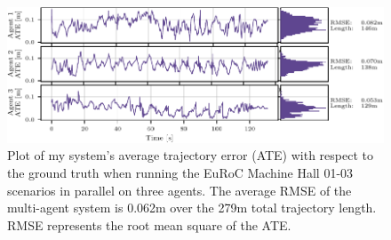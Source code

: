 \begin{figure}[h]
    \centering
    \includegraphics[width=\linewidth]{figures/apr11_tum_room_trajectory_a_line_plot.pdf}

    \caption{Plot of my system's average trajectory error (ATE) with respect to the ground truth when running the EuRoC Machine Hall 01-03 scenarios in parallel on three agents. The average RMSE of the multi-agent system is 0.062m over the 279m total trajectory length. \captionbreak RMSE represents the root mean square of the ATE.}
    \label{fig:euroc-mh-01-03-line-plot}
\end{figure}

